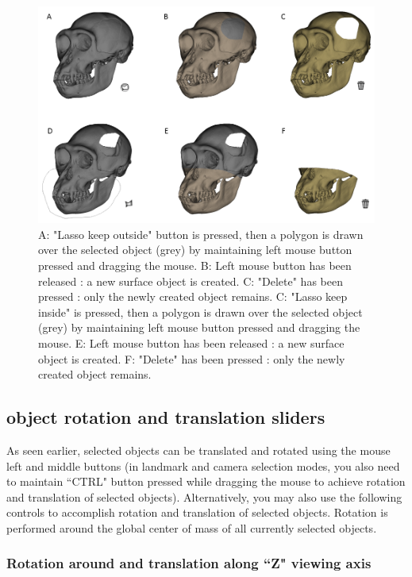 \begin{figure}
  \centering
  \includegraphics[scale=0.6]{images/06/objects/lasso_cut.png} 
	\caption{A: "Lasso keep outside" button is pressed, then a polygon is drawn over the selected object (grey) by maintaining left mouse button pressed and dragging the mouse. B: Left mouse button has been released : a new surface object is  created. C: "Delete" has been pressed : only the newly created  object remains. C: "Lasso keep inside" is pressed, then a polygon is drawn over the selected object (grey) by maintaining left mouse button pressed and dragging the mouse. E: Left mouse button has been released : a new surface object is  created. F: "Delete" has been pressed : only the newly created  object remains. }
\label{lasso_cut}
 
\end{figure}




\subsection{object rotation and translation sliders}
	As seen earlier, selected objects can be translated and rotated using the mouse left and middle buttons
(in landmark and camera selection modes, you also need to maintain ``CTRL" button pressed
while dragging the mouse to achieve rotation and translation of selected objects). Alternatively, you
may also use the following controls to accomplish rotation and translation of selected objects. Rotation
is performed around the global center of mass of all currently selected objects.

\subsubsection{Rotation around and translation along ``Z" viewing axis }

